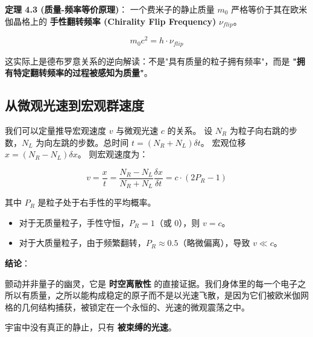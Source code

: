 \textbf{定理 4.3 (质量-频率等价原理)}：
一个费米子的静止质量 $m_0$ 严格等价于其在欧米伽晶格上的 \textbf{手性翻转频率 (Chirality Flip Frequency)} $\nu_{flip}$。

\[m_0 c^2 = h \cdot \nu_{flip}\]

这实际上是德布罗意关系的逆向解读：不是"具有质量的粒子拥有频率"，而是 \textbf{"拥有特定翻转频率的过程被感知为质量"}。

\subsection{从微观光速到宏观群速度}

我们可以定量推导宏观速度 $v$ 与微观光速 $c$ 的关系。
设 $N_R$ 为粒子向右跳的步数，$N_L$ 为向左跳的步数。总时间 $t = (N_R + N_L) \delta t$。
宏观位移 $x = (N_R - N_L) \delta x$。
则宏观速度为：

\[v = \frac{x}{t} = \frac{N_R - N_L}{N_R + N_L} \frac{\delta x}{\delta t} = c \cdot (2P_R - 1)\]

其中 $P_R$ 是粒子处于右手性的平均概率。

\begin{itemize}
\item 对于无质量粒子，手性守恒，$P_R = 1$（或 0），则 $v = c$。
\item 对于大质量粒子，由于频繁翻转，$P_R \approx 0.5$（略微偏离），导致 $v \ll c$。
\end{itemize}

\textbf{结论}：

颤动并非量子的幽灵，它是 \textbf{时空离散性} 的直接证据。我们身体里的每一个电子之所以有质量，之所以能构成稳定的原子而不是以光速飞散，是因为它们被欧米伽网格的几何结构捕获，被锁定在一个永恒的、光速的微观震荡之中。

宇宙中没有真正的静止，只有 \textbf{被束缚的光速}。
